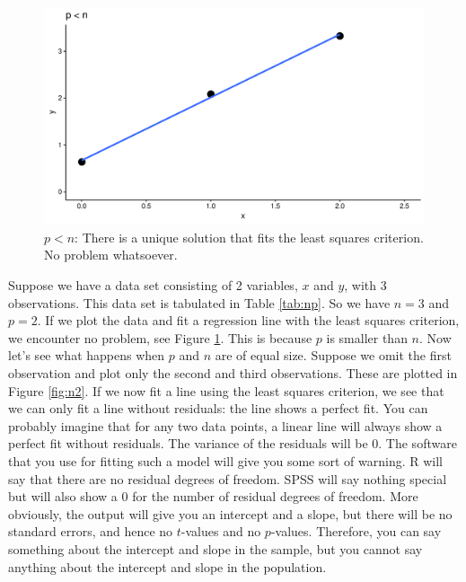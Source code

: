\documentclass[]{book}\usepackage[]{graphicx}\usepackage[]{color}
\makeatletter
\def\maxwidth{ %
  \ifdim\Gin@nat@width>\linewidth
    \linewidth
  \else
    \Gin@nat@width
  \fi
}
\newenvironment{knitrout}{}{} %
\makeatother
\begin{document}
\begin{knitrout}
\color{fgcolor}\begin{figure}
\includegraphics[width=\maxwidth]{figure/n3-1} \caption[$p < n$]{$p < n$: There is a unique solution that fits the least squares criterion. No problem whatsoever.}\label{fig:n3}
\end{figure}


\end{knitrout}


Suppose we have a data set consisting of 2 variables, $x$ and $y$, with 3 observations. This data set is tabulated in Table \ref{tab:np}. So we have $n = 3$ and $p = 2$. If we plot the data and fit a regression line with the least squares criterion, we encounter no problem, see Figure \ref{fig:n3}. This is because $p$ is smaller than $n$. 
Now let's see what happens when $p$ and $n$ are of equal size. Suppose we omit the first observation and plot only the second and third observations. These are plotted in Figure \ref{fig:n2}. If we now fit a line using the least squares criterion, we see that we can only fit a line without residuals: the line shows a perfect fit. You can probably imagine that for any two data points, a linear line will always show a perfect fit without residuals. The variance of the residuals will be 0. The software that you use for fitting such a model will give you some sort of warning. R will say that there are no residual degrees of freedom. SPSS will say nothing special but will also show a 0 for the number of residual degrees of freedom. More obviously, the output will give you an intercept and a slope, but there will be no standard errors, and hence no $t$-values and no $p$-values. Therefore, you can say something about the intercept and slope in the sample, but you cannot say anything about the intercept and slope in the population. 
\end{document}
